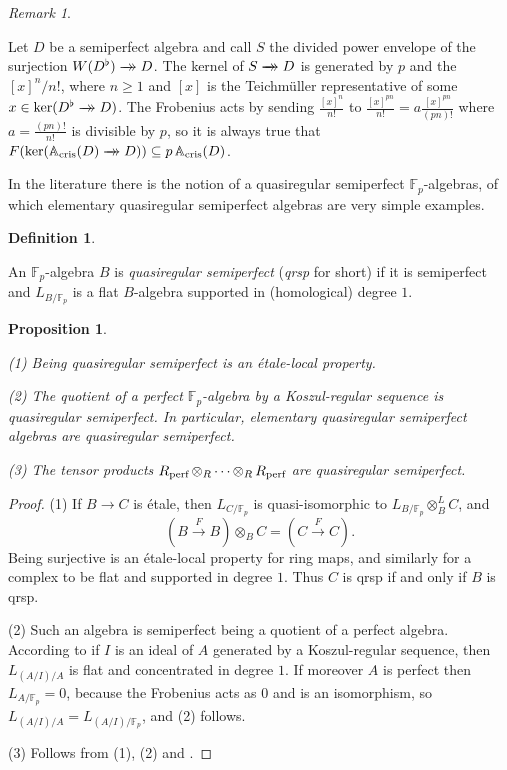 \documentclass[11pt]{article}
\theoremstyle{plain}
\newtheorem{Prop}[Thm]{Proposition}
\theoremstyle{definition}
\newtheorem{Def}[Thm]{Definition}
\theoremstyle{remark}
\newtheorem{Rem}[Thm]{Remark}
\numberwithin{equation}{section}
\newenvironment{propos}[1]%
    { \begin{Prop} \label{P:#1}}%
    { \end{Prop} }
\newcommand{\prop}[1]{\begin{propos}{#1}\sl }
\newcommand{\eprop}{\end{propos}}
\newenvironment{defeni}[1]%
    { \begin{Def} \label{D:#1}}%
    { \end{Def} }
\newcommand{\defe}[1]{\begin{defeni}{#1} }
\newcommand{\edefe}{\end{defeni}}
\newenvironment{remark}[1]%
    { \begin{Rem} \label{R:#1}}%
    { \end{Rem} }
\newcommand{\rem}[1]{\begin{remark}{#1}}
\newcommand{\erem}{\end{remark}}
\newcommand{\prf}{ \begin{proof} }
\newcommand{\epr}{ \end{proof} }
\DeclareMathOperator{\ten}{\otimes}
\newcommand{\Fp}{\mathbb{F}_p}
\newcommand{\onto}[2][]{\xrightarrow[#1]{#2}\mathrel{\mkern-14mu}\rightarrow}           %
\newcommand\xto[2]{\xrightarrow[#1]{#2}}
\newcommand{\Ll}{L}                                                      %
\DeclareMathOperator{\Acr}{\mathbb{A}_{cris}}                            %
\newcommand\perf[1]{#1^{\flat}}                                          %
\newcommand\coperf[1]{#1_{\textnormal{perf}}}                            %
\begin{document}
\rem{}

Let $D$ be a semiperfect algebra and call $S$ the divided power envelope of the surjection $W(\perf{D})\onto{}{}D$. The kernel of $S\onto{}{}D$ is generated by $p$ and the $[x]^n/n!$, where $n\ge1$ and $[x]$ is the Teichmüller representative of some $x\in\ker(\perf{D}\onto{}{}D)$. The Frobenius acts by sending $\frac{[x]^n}{n!}$ to $\frac{[x]^{pn}}{n!}=a\frac{[x]^{pn}}{(pn)!}$ where $a=\frac{(pn)!}{n!}$ is divisible by $p$, so it is always true that $F(\ker(\Acr(D)\onto{}{}D))\subseteq p\Acr(D)$. 

\erem


In the literature there is the notion of a quasiregular semiperfect $\Fp$-algebras, of which elementary quasiregular semiperfect algebras are very simple examples.


\defe{spqr}

An $\Fp$-algebra $B$ is \textit{quasiregular semiperfect} (\textit{qrsp} for short) if it is semiperfect and $ \Ll_{B/\Fp}$ is a flat $B$-algebra supported in (homological) degree $1$.

\edefe

\prop{spqr}

(1) Being quasiregular semiperfect is an étale-local property.

(2) The quotient of a perfect $\Fp$-algebra by a Koszul-regular sequence is quasiregular semiperfect. In particular, elementary quasiregular semiperfect algebras are quasiregular semiperfect.

(3) The tensor products $\coperf{R}\ten_R\dotsb\ten_R\coperf{R}$ are quasiregular semiperfect.
\eprop

\prf

(1) If $B\to C$ is étale, then $ \Ll_{C/\Fp}$ is quasi-isomorphic to $ \Ll_{B/\Fp}\ten_B^LC$, and 
\[
(B\xto{}{F}B)\ten_BC=(C\xto{}{F}C).
\]
Being surjective is an étale-local property for ring maps, and similarly for a complex to be flat and supported in degree $1$. Thus $C$ is qrsp if and only if $B$ is qrsp.

(2) Such an algebra is semiperfect being a quotient of a perfect algebra. According to \cite[Tag 08SK]{stacksproject} if $I$ is an ideal of $A$ generated by a Koszul-regular sequence, then $ \Ll_{(A/I)/A}$ is flat and concentrated in degree $1$. If moreover $A$ is perfect then $ \Ll_{A/\Fp}=0$, because the Frobenius acts as $0$ and is an isomorphism, so $ \Ll_{(A/I)/A}= \Ll_{(A/I)/\Fp}$, and (2) follows.

(3) Follows from (1), (2) and .\epr
\end{document}
